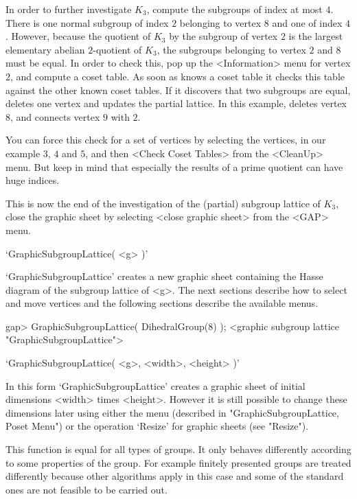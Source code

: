 In order to further investigate $K_3$, compute the  subgroups of index at
most $4$.  There is one normal subgroup of  index $2$ belonging to vertex
$8$ and one of index $4$.  However, because the quotient  of $K_3$ by the
subgroup of vertex $2$ is  the largest elementary abelian $2$-quotient of
$K_3$, the subgroups belonging to vertex  $2$ and $8$ must  be equal.  In
order  to check this,  pop up the  <Information> menu for vertex $2$, and
compute a coset table.  As soon  as {\GAP} knows  a coset table it checks
this table against the other known coset tables. If it discovers that two
subgroups are equal, {\GAP} deletes   one vertex and updates the  partial
lattice.  In this example, {\GAP} deletes vertex $8$, and connects vertex
$9$ with $2$.

You can force this check for a set of vertices by selecting the vertices,
in our example  $3$, $4$ and $5$, and  then <Check Coset Tables> from the
<CleanUp> menu.  But keep in mind that  especially the results of a prime
quotient can have huge indices.

This is  now   the end  of the investigation   of  the (partial) subgroup
lattice of $K_3$,  close the graphic  sheet  by selecting <close  graphic
sheet> from the <GAP> menu.


`GraphicSubgroupLattice( <g> )'

`GraphicSubgroupLattice' creates a new graphic sheet containing the Hasse
diagram of the subgroup lattice of <g>.  The next sections describe
how to select and move vertices and the following sections describe the
available menus.

\begintt
gap> GraphicSubgroupLattice( DihedralGroup(8) );
<graphic subgroup lattice "GraphicSubgroupLattice">
\endtt

`GraphicSubgroupLattice( <g>, <width>, <height> )'

In this form `GraphicSubgroupLattice' creates a graphic sheet of initial
dimensions <width> times <height>.  However it is still possible to change
these dimensions later using either the menu (described in
"GraphicSubgroupLattice, Poset Menu") or the operation `Resize' for graphic 
sheets (see "Resize").

This function is equal for all types of groups. It only behaves differently
according to some properties of the group. For example finitely presented
groups are treated differently because other algorithms apply in this case
and some of the standard ones are not feasible to be carried out. 

